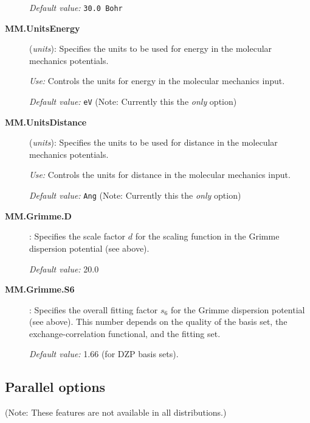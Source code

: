 \documentclass[11pt]{article}
\begin{document}
\begin{description}
{\it Default value:}  {\tt 30.0 Bohr}

\item[{\bf MM.UnitsEnergy}] ({\it units}):  Specifies the units to be used for energy in the 
molecular mechanics potentials.

{\it Use:} Controls the units for energy in the molecular mechanics input.

{\it Default value:}  {\tt eV} (Note: Currently this the {\em only} option)

\item[{\bf MM.UnitsDistance}] ({\it units}):  Specifies the units to be used for distance in the 
molecular mechanics potentials.

{\it Use:} Controls the units for distance in the molecular mechanics input.

{\it Default value:}  {\tt Ang} (Note: Currently this the {\em only} option)

\item[{\bf MM.Grimme.D}] :  Specifies the scale factor $d$ for the scaling function
in the Grimme dispersion potential (see above).

{\it Default value:}  { 20.0 } 

\item[{\bf MM.Grimme.S6}] :  Specifies the overall fitting factor $s_6$ for the
Grimme dispersion potential (see above). This number depends on the
quality of the basis set, the exchange-correlation functional, and the
fitting set. 

{\it Default value:}  { 1.66 } (for DZP basis sets).

\end{description}

\vspace{5pt}
\subsection{Parallel options}

(Note: These features are not available in all distributions.)
\end{document}
